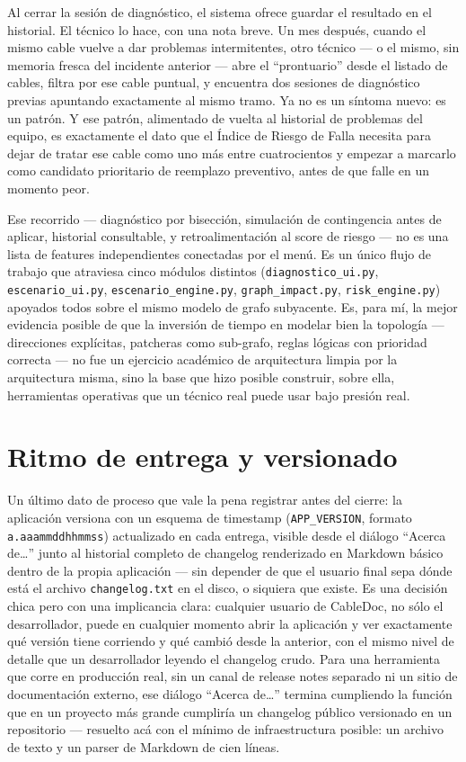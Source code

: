 \documentclass[11pt,twocolumn]{article}
\begin{document}
Al cerrar la sesión de diagnóstico, el sistema ofrece guardar el resultado en el historial. El técnico lo hace, con una nota breve. Un mes después, cuando el mismo cable vuelve a dar problemas intermitentes, otro técnico --- o el mismo, sin memoria fresca del incidente anterior --- abre el ``prontuario'' desde el listado de cables, filtra por ese cable puntual, y encuentra dos sesiones de diagnóstico previas apuntando exactamente al mismo tramo. Ya no es un síntoma nuevo: es un patrón. Y ese patrón, alimentado de vuelta al historial de problemas del equipo, es exactamente el dato que el Índice de Riesgo de Falla necesita para dejar de tratar ese cable como uno más entre cuatrocientos y empezar a marcarlo como candidato prioritario de reemplazo preventivo, antes de que falle en un momento peor.

Ese recorrido --- diagnóstico por bisección, simulación de contingencia antes de aplicar, historial consultable, y retroalimentación al score de riesgo --- no es una lista de features independientes conectadas por el menú. Es un único flujo de trabajo que atraviesa cinco módulos distintos (\texttt{diagnostico\_ui.py}, \texttt{escenario\_ui.py}, \texttt{escenario\_engine.py}, \texttt{graph\_impact.py}, \texttt{risk\_engine.py}) apoyados todos sobre el mismo modelo de grafo subyacente. Es, para mí, la mejor evidencia posible de que la inversión de tiempo en modelar bien la topología --- direcciones explícitas, patcheras como sub-grafo, reglas lógicas con prioridad correcta --- no fue un ejercicio académico de arquitectura limpia por la arquitectura misma, sino la base que hizo posible construir, sobre ella, herramientas operativas que un técnico real puede usar bajo presión real.

\section{Ritmo de entrega y versionado}

Un último dato de proceso que vale la pena registrar antes del cierre: la aplicación versiona con un esquema de timestamp (\texttt{APP\_VERSION}, formato \texttt{a.aaammddhhmmss}) actualizado en cada entrega, visible desde el diálogo ``Acerca de…'' junto al historial completo de changelog renderizado en Markdown básico dentro de la propia aplicación --- sin depender de que el usuario final sepa dónde está el archivo \texttt{changelog.txt} en el disco, o siquiera que existe. Es una decisión chica pero con una implicancia clara: cualquier usuario de CableDoc, no sólo el desarrollador, puede en cualquier momento abrir la aplicación y ver exactamente qué versión tiene corriendo y qué cambió desde la anterior, con el mismo nivel de detalle que un desarrollador leyendo el changelog crudo. Para una herramienta que corre en producción real, sin un canal de release notes separado ni un sitio de documentación externo, ese diálogo ``Acerca de…'' termina cumpliendo la función que en un proyecto más grande cumpliría un changelog público versionado en un repositorio --- resuelto acá con el mínimo de infraestructura posible: un archivo de texto y un parser de Markdown de cien líneas.
\end{document}
